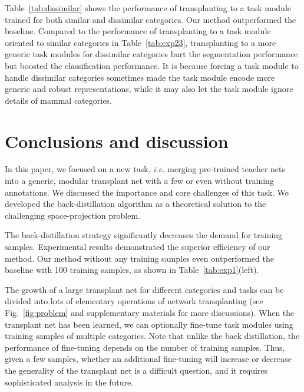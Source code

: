 \documentclass[10pt,twocolumn,letterpaper]{article}
\begin{document}
Table~\ref{tab:dissimilar} shows the performance of transplanting to a task module trained for both similar and dissimilar categories. Our method outperformed the baseline. Compared to the performance of transplanting to a task module oriented to similar categories in Table~\ref{tab:exp23}, transplanting to a more generic task modules for dissimilar categories hurt the segmentation performance but boosted the classification performance. It is because forcing a task module to handle dissimilar categories sometimes made the task module encode more generic and robust representations, while it may also let the task module ignore details of mammal categories.

\section{Conclusions and discussion}

In this paper, we focused on a new task, \emph{i.e.} merging pre-trained teacher nets into a generic, modular transplant net with a few or even without training annotations. We discussed the importance and core challenges of this task. We developed the back-distillation algorithm as a theoretical solution to the challenging space-projection problem.

The back-distillation strategy significantly decreases the demand for training samples. Experimental results demonstrated the superior efficiency of our method. Our method without any training samples even outperformed the baseline with 100 training samples, as shown in Table~\ref{tab:exp1}(left).



The growth of a large transplant net for different categories and tasks can be divided into lots of elementary operations of network transplanting (see Fig.~\ref{fig:problem} and supplementary materials for more discussions). When the transplant net has been learned, we can optionally fine-tune task modules using training samples of multiple categories. Note that unlike the back distillation, the performance of fine-tuning depends on the number of training samples. Thus, given a few samples, whether an additional fine-tuning will increase or decrease the generality of the transplant net is a difficult question, and it requires sophisticated analysis in the future.
\end{document}
